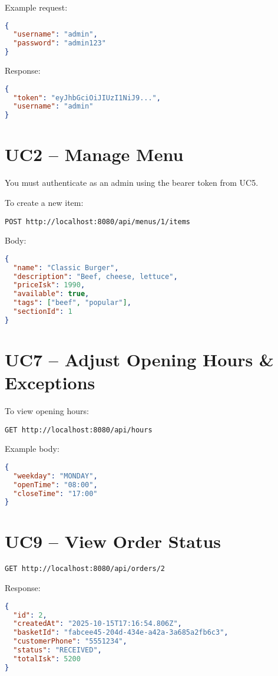 \documentclass{article}
\begin{document}
Example request:
\begin{lstlisting}[language=json]
{
  "username": "admin",
  "password": "admin123"
}
\end{lstlisting}

Response:
\begin{lstlisting}[language=json]
{
  "token": "eyJhbGciOiJIUzI1NiJ9...",
  "username": "admin"
}
\end{lstlisting}

\section*{UC2 -- Manage Menu}

You must authenticate as an admin using the bearer token from UC5.

To create a new item:
\begin{lstlisting}
POST http://localhost:8080/api/menus/1/items
\end{lstlisting}

Body:
\begin{lstlisting}[language=json]
{
  "name": "Classic Burger",
  "description": "Beef, cheese, lettuce",
  "priceIsk": 1990,
  "available": true,
  "tags": ["beef", "popular"],
  "sectionId": 1
}
\end{lstlisting}

\section*{UC7 -- Adjust Opening Hours \& Exceptions}

To view opening hours:
\begin{lstlisting}
GET http://localhost:8080/api/hours
\end{lstlisting}

Example body:
\begin{lstlisting}[language=json]
{
  "weekday": "MONDAY",
  "openTime": "08:00",
  "closeTime": "17:00"
}
\end{lstlisting}

\section*{UC9 -- View Order Status}

\begin{lstlisting}
GET http://localhost:8080/api/orders/2
\end{lstlisting}

Response:
\begin{lstlisting}[language=json]
{
  "id": 2,
  "createdAt": "2025-10-15T17:16:54.806Z",
  "basketId": "fabcee45-204d-434e-a42a-3a685a2fb6c3",
  "customerPhone": "5551234",
  "status": "RECEIVED",
  "totalIsk": 5200
}
\end{lstlisting}
\end{document}
